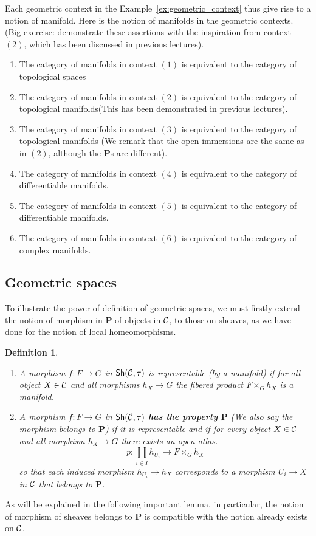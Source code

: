\documentclass{tufte-book} %
\numberwithin{dummy}{section}
\newtheorem{dfn}[thm]{Definition}
\newcommand{\calc}{{\cal C}}
\newcommand{\lrta}{\longrightarrow}
\newcommand{\ssh}{\mathsf{Sh}}
\newcommand{\bfp}{\mathbf{P}}
\begin{document}
Each geometric context in the Example~\ref{ex:geometric_context} thus give rise to a notion of manifold. Here is the notion of manifolds in the geometric contexts. (Big exercise: demonstrate these assertions with the inspiration from context $(2)$, which has been discussed in previous lectures).
\begin{enumerate}
\item The category of manifolds in context $(1)$ is equivalent to the category of topological spaces
\item The category of manifolds in context $(2)$ is equivalent to the category of topological manifolds(This has been demonstrated in previous lectures).
\item The category of manifolds in context $(3)$ is equivalent to the category of topological manifolds
(We remark that the open immersions are the same as in $(2)$, although the $\bfp$s are different).
\item The category of manifolds in context $(4)$ is equivalent to the category of differentiable manifolds.
\item The category of manifolds in context $(5)$ is equivalent to the category of differentiable manifolds.
\item The category of manifolds in context $(6)$ is equivalent to the category of complex manifolds.
\end{enumerate}


\subsection{Geometric spaces}
To illustrate the  power of definition of geometric spaces, we must firstly extend the notion of morphism in $\bfp$ of objects in $\calc$, to those on sheaves, as we have done for the notion of local homeomorphisms.
\begin{dfn}\label{dfn:geometric_space_property}\ 
\begin{enumerate}
\item A morphism $f: F\lrta G$ in $\ssh(\calc,\tau)$ is representable (by a manifold) if for all object $X\in \calc$ and all morphisms $h_X\lrta G$ the fibered product $F\times_G h_X$ is a manifold.
\item A morphism $f:F\lrta G$ in $\ssh(\calc,\tau)$ \textbf{has the property $\bfp$} (We also say the morphism belongs to $\bfp$) if it is representable and if for every object $X\in\calc$ and all morphism $h_X\lrta G$ there exists an open atlas.
$$
p:\coprod_{i\in I}h_{U_i}\lrta F\times_G h_X
$$
so that each induced morphism $h_{U_i}\lrta h_X$ corresponds to a morphism $U_i\lrta X$ in $\calc$ that belongs to $\bfp$.
\end{enumerate}
\end{dfn} 
As will be explained in the following important lemma, in particular, the notion of morphism of sheaves belongs to $\bfp$ is compatible with the notion already exists on $\calc$.
\end{document}
